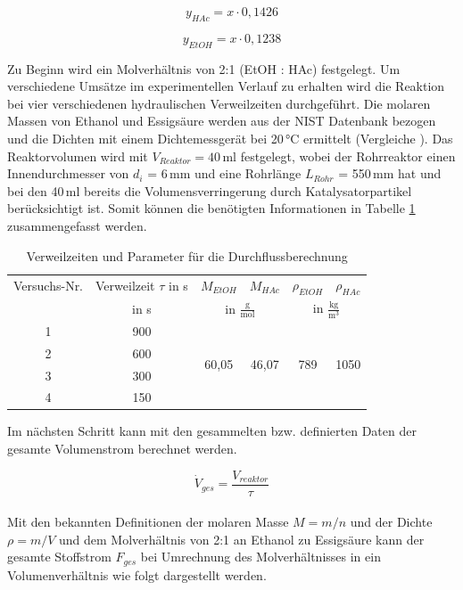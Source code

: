 \documentclass[12pt,liststotoc]{report}
\begin{document}
\begin{equation}
\label{PumpeHAc}
    y_{HAc} = x \cdot 0,1426
\end{equation}

\begin{equation}
\label{PumpeEtOH}
     y_{EtOH} = x \cdot 0,1238
\end{equation}


\noindent
Zu Beginn wird ein Molverhältnis  von 2:1 (EtOH : HAc) festgelegt. Um verschiedene Umsätze im experimentellen Verlauf zu erhalten wird die Reaktion bei vier verschiedenen hydraulischen Verweilzeiten durchgeführt. Die molaren Massen von Ethanol und Essigsäure werden aus der NIST Datenbank bezogen  \cite{Ethanol,Essigsaure} und die Dichten mit einem Dichtemessgerät bei 20\,°C ermittelt (Vergleiche \cite{Dichtemessung_Vergleich}). Das Reaktorvolumen wird mit $V_{Reaktor} = 40$\,ml festgelegt, wobei der Rohrreaktor einen Innendurchmesser von $d_{i}$ = 6\,mm und eine Rohrlänge $L_{Rohr}$ = 550\,mm hat und bei den 40\,ml bereits die Volumensverringerung durch Katalysatorpartikel berücksichtigt ist. Somit können die benötigten Informationen in Tabelle \ref{tab:Verweilzeiten} zusammengefasst werden.

\begin{table}[H]
	\caption{Verweilzeiten und Parameter für die Durchflussberechnung}
	\centering
	\begin{tabular}{cc|cccc}
		\toprule 
		Versuchs-Nr. & Verweilzeit $\tau$ in s & $M_{EtOH}$ \cite{Ethanol} & $M_{HAc}$ \cite{Essigsaure}  & $\rho_{EtOH}$  & $\rho_{HAc}$ \\
		&in s&\multicolumn{2}{c}{in $\frac{\text{g}}{\text{mol}}$}&\multicolumn{2}{c}{in $\frac{\text{kg}}{\text{m}^3}$} \\
		\midrule
		1 & 900 & \multirow{4}{*}{60,05} &  \multirow{4}{*}{46,07} & \multirow{4}{*}{789} & \multirow{4}{*}{1050}\\
		2 & 600 \\
		3 & 300 \\
		4 & 150 \\
		\bottomrule
	\end{tabular}
	\label{tab:Verweilzeiten}
\end{table}
\noindent
Im nächsten Schritt kann mit den gesammelten bzw. definierten Daten der gesamte Volumenstrom berechnet werden.

\begin{equation}
    \dot{V}_{ges} = \frac{V_{reaktor}}{\tau}
\end{equation}
\\
\noindent
Mit den bekannten Definitionen der molaren Masse $M = m/n$ und der Dichte $\rho = m/V$ und dem Molverhältnis von 2:1 an Ethanol zu Essigsäure kann der gesamte Stoffstrom $F_{ges}$ bei Umrechnung des Molverhältnisses in ein Volumenverhältnis wie folgt dargestellt werden.
\end{document}
